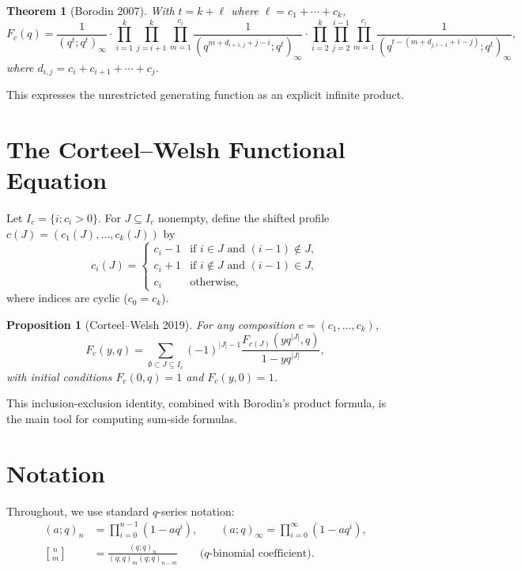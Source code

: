 \documentclass[11pt]{article}
\newtheorem{theorem}{Theorem}
\newtheorem{proposition}{Proposition}
\begin{document}
\begin{theorem}[Borodin 2007]
With $t = k + \ell$ where $\ell = c_1+\cdots+c_k$,
\[
F_c(q) = \frac{1}{(q^t;q^t)_\infty} \cdot
\prod_{i=1}^k \prod_{j=i+1}^k \prod_{m=1}^{c_i} \frac{1}{(q^{m+d_{i+1,j}+j-i};q^t)_\infty}
\cdot
\prod_{i=2}^k \prod_{j=2}^{i-1} \prod_{m=1}^{c_i} \frac{1}{(q^{t-(m+d_{j,i-1}+i-j)};q^t)_\infty},
\]
where $d_{i,j} = c_i + c_{i+1} + \cdots + c_j$.
\end{theorem}

This expresses the unrestricted generating function as an explicit infinite product.

\section{The Corteel--Welsh Functional Equation}

Let $I_c = \{i : c_i > 0\}$. For $J \subseteq I_c$ nonempty, define the shifted profile $c(J) = (c_1(J),\ldots,c_k(J))$ by
\[
c_i(J) = \begin{cases}
c_i - 1 & \text{if } i \in J \text{ and } (i-1) \notin J, \\
c_i + 1 & \text{if } i \notin J \text{ and } (i-1) \in J, \\
c_i & \text{otherwise,}
\end{cases}
\]
where indices are cyclic ($c_0 = c_k$).

\begin{proposition}[Corteel--Welsh 2019]
For any composition $c = (c_1,\ldots,c_k)$,
\[
F_c(y,q) = \sum_{\emptyset \subset J \subseteq I_c} (-1)^{|J|-1} \frac{F_{c(J)}(yq^{|J|},q)}{1-yq^{|J|}},
\]
with initial conditions $F_c(0,q) = 1$ and $F_c(y,0) = 1$.
\end{proposition}

This inclusion-exclusion identity, combined with Borodin's product formula, is the main tool for computing sum-side formulas.

\section{Notation}

Throughout, we use standard $q$-series notation:
\begin{align}
(a;q)_n &= \prod_{i=0}^{n-1}(1-aq^i), \qquad
(a;q)_\infty = \prod_{i=0}^{\infty}(1-aq^i), \\
\genfrac{[}{]}{0pt}{}{n}{m} &= \frac{(q;q)_n}{(q;q)_m(q;q)_{n-m}} \qquad \text{($q$-binomial coefficient)}.
\end{align}
\end{document}
